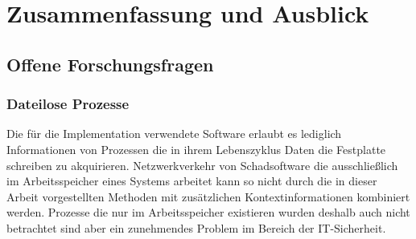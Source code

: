 \chapter{Zusammenfassung und Ausblick}%
\label{cha:conclusion}


\section{Offene Forschungsfragen} 
\subsection{Dateilose Prozesse}
Die für die Implementation verwendete Software erlaubt es lediglich Informationen von Prozessen die in ihrem Lebenszyklus Daten die Festplatte schreiben zu akquirieren. Netzwerkverkehr von Schadsoftware die ausschließlich im Arbeitsspeicher eines Systems arbeitet kann so nicht durch die in dieser Arbeit vorgestellten Methoden mit zusätzlichen Kontextinformationen kombiniert werden. Prozesse die nur im Arbeitsspeicher existieren wurden deshalb auch nicht betrachtet sind aber ein zunehmendes Problem im Bereich der IT-Sicherheit.
